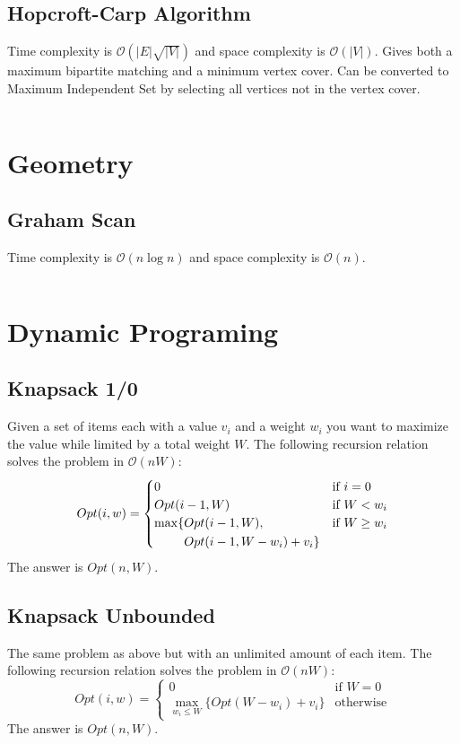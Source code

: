 \documentclass[8pt,a4paper,landscape,oneside]{amsart}
\newcommand{\code}[1]{\inputminted[fontsize=\normalsize,baselinestretch=1]{java}{code/#1}}
\newcommand{\bigO}{\mathcal{O}}
\begin{document}
\begin{multicols*}{3}
  \subsection{Hopcroft-Carp Algorithm}
  Time complexity is $\bigO(|E|\sqrt{|V|})$ and space complexity is $\bigO(|V|)$. Gives both a maximum bipartite matching and a minimum vertex cover. Can be converted to Maximum Independent Set by selecting all vertices not in the vertex cover.
  \code{Graphs/HopcroftCarp.java}
  
  
\section{Geometry}
  \subsection{Graham Scan}
  Time complexity is $\bigO(n\log{n})$ and space complexity is $\bigO(n)$.
  \code{Geometry/GrahamScan.java}
  
\section{Dynamic Programing}
  \subsection{Knapsack 1/0}
  Given a set of items each with a value $v_i$ and a weight $w_i$ you want to maximize the value while limited by a total weight $W$. The following recursion relation solves the problem in $\bigO(nW)$:
  \[
  Opt(i,w) = \begin{cases}
  0 & \text{if } i=0 \\
  Opt(i-1,W) & \text{if } W<w_i \\
  \begin{aligned}[t]\arraycolsep=0pt
    \max\lbrace &
      Opt(i-1,W), \\ &
      Opt(i-1,W-w_i) + v_i \rbrace
  \end{aligned} & \text{if } W \geq w_i
  \end{cases}
  \]
  The answer is $Opt(n, W)$.
  
  \subsection{Knapsack Unbounded}
  The same problem as above but with an unlimited amount of each item. The following recursion relation solves the problem in $\bigO(nW)$:
  \[
  Opt(i,w) = \begin{cases}
  0 & \text{if } W=0 \\
  \max\limits_{w_i \leq W} \lbrace Opt(W-w_i) + v_i \rbrace & \text{otherwise}
  \end{cases}
  \]
  The answer is $Opt(n, W)$.
  

\end{multicols*}
\end{document}
